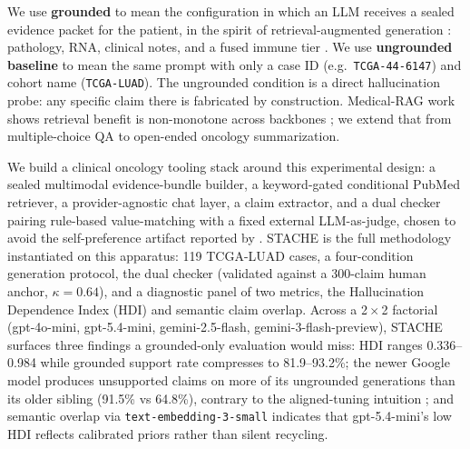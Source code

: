 \documentclass[11pt]{article}
\begin{document}
We use \textbf{grounded} to mean the configuration in which an LLM receives a sealed evidence packet for the patient, in the spirit of retrieval-augmented generation \citep{lewis2020rag,shuster2021retrieval}: pathology, RNA, clinical notes, and a fused immune tier \citep{thorsson2018immune}. We use \textbf{ungrounded baseline} to mean the same prompt with only a case ID (e.g.\ \texttt{TCGA-44-6147}) and cohort name (\texttt{TCGA-LUAD}). The ungrounded condition is a direct hallucination probe: any specific claim there is fabricated by construction. Medical-RAG work shows retrieval benefit is non-monotone across backbones \citep{xiong2024benchmarking}; we extend that from multiple-choice QA to open-ended oncology summarization.

We build a clinical oncology tooling stack \citep{collisson2014comprehensive} around this experimental design: a sealed multimodal evidence-bundle builder, a keyword-gated conditional PubMed retriever, a provider-agnostic chat layer, a claim extractor, and a dual checker pairing rule-based value-matching with a fixed external LLM-as-judge, chosen to avoid the self-preference artifact reported by \citet{panickssery2024llm}. STACHE is the full methodology instantiated on this apparatus: 119 TCGA-LUAD cases, a four-condition generation protocol, the dual checker (validated against a 300-claim human anchor, $\kappa = 0.64$), and a diagnostic panel of two metrics, the Hallucination Dependence Index (HDI) and semantic claim overlap. Across a 2\,$\times$\,2 factorial (gpt-4o-mini, gpt-5.4-mini, gemini-2.5-flash, gemini-3-flash-preview), STACHE surfaces three findings a grounded-only evaluation would miss: HDI ranges 0.336--0.984 while grounded support rate compresses to 81.9--93.2\%; the newer Google model produces unsupported claims on more of its ungrounded generations than its older sibling (91.5\% vs 64.8\%), contrary to the aligned-tuning intuition \citep{ouyang2022training}; and semantic overlap via \texttt{text-embedding-3-small} \citep{openai2024embeddings} indicates that gpt-5.4-mini's low HDI reflects calibrated priors rather than silent recycling.
\end{document}
